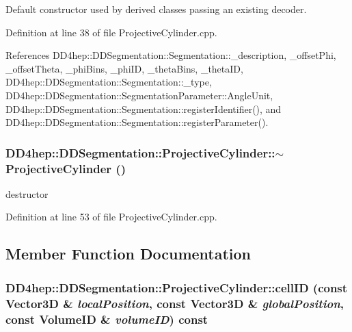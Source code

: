 Default constructor used by derived classes passing an existing decoder. 

Definition at line 38 of file ProjectiveCylinder.cpp.

References DD4hep::DDSegmentation::Segmentation::\_\-description, \_\-offsetPhi, \_\-offsetTheta, \_\-phiBins, \_\-phiID, \_\-thetaBins, \_\-thetaID, DD4hep::DDSegmentation::Segmentation::\_\-type, DD4hep::DDSegmentation::SegmentationParameter::AngleUnit, DD4hep::DDSegmentation::Segmentation::registerIdentifier(), and DD4hep::DDSegmentation::Segmentation::registerParameter().\hypertarget{class_d_d4hep_1_1_d_d_segmentation_1_1_projective_cylinder_a0177b7d45729494e87f22d74aa0f872a}{
\subsubsection[{$\sim$ProjectiveCylinder}]{\setlength{\rightskip}{0pt plus 5cm}DD4hep::DDSegmentation::ProjectiveCylinder::$\sim$ProjectiveCylinder ()}}
\label{class_d_d4hep_1_1_d_d_segmentation_1_1_projective_cylinder_a0177b7d45729494e87f22d74aa0f872a}


destructor 

Definition at line 53 of file ProjectiveCylinder.cpp.

\subsection{Member Function Documentation}
\hypertarget{class_d_d4hep_1_1_d_d_segmentation_1_1_projective_cylinder_a5aaa84e94618e058c743cf5bd44db446}{
\subsubsection[{cellID}]{ DD4hep::DDSegmentation::ProjectiveCylinder::cellID (const {\bf Vector3D} \& {\em localPosition}, \/  const {\bf Vector3D} \& {\em globalPosition}, \/  const {\bf VolumeID} \& {\em volumeID}) const}}
\label{class_d_d4hep_1_1_d_d_segmentation_1_1_projective_cylinder_a5aaa84e94618e058c743cf5bd44db446}


